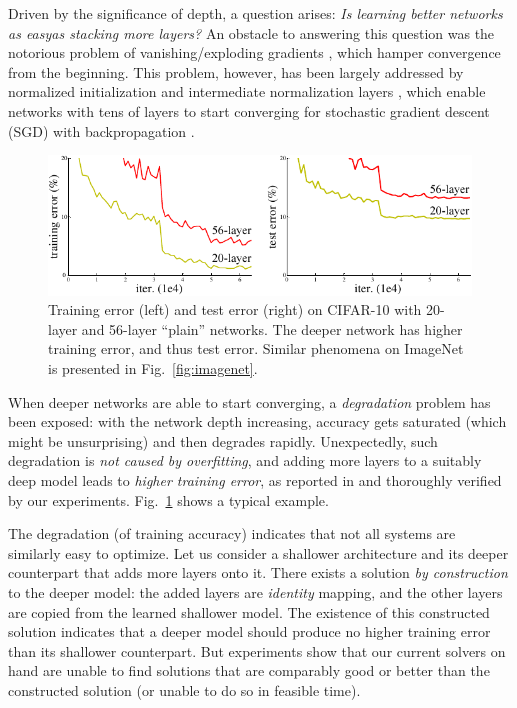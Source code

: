 \documentclass[10pt,twocolumn,letterpaper]{article}
\begin{document}
Driven by the significance of depth, a question arises: \emph{Is learning better networks as easyas stacking more layers?}
An obstacle to answering this question was the notorious problem of vanishing/exploding gradients \cite{Bengio1994,Glorot2010}, which hamper convergence from the beginning. This problem, however, has been largely addressed by normalized initialization \cite{LeCun1998,Glorot2010,Saxe2013,He2015} and intermediate normalization layers \cite{Ioffe2015}, which enable networks with tens of layers to start converging for stochastic gradient descent (SGD) with backpropagation \cite{LeCun1989}.

\begin{figure}[t]
  \begin{center}
    \includegraphics[width=1.0\linewidth]{eps/teaser}
  \end{center}
  \vspace{-1.2em}
  \caption{Training error (left) and test error (right) on CIFAR-10 with 20-layer and 56-layer ``plain'' networks. The deeper network has higher training error, and thus test error. Similar phenomena on ImageNet is presented in Fig.~\ref{fig:imagenet}.}
  \label{fig:teaser}
  \vspace{-1em}
\end{figure}

When deeper networks are able to start converging, a \emph{degradation} problem has been exposed:  with the network depth increasing, accuracy gets saturated (which might be unsurprising) and then degrades rapidly. Unexpectedly, such degradation is \emph{not caused by overfitting}, and adding more layers to a suitably deep model leads to \emph{higher training error}, as reported in \cite{He2015a, Srivastava2015} and thoroughly verified by our experiments. Fig.~\ref{fig:teaser} shows a typical example.

The degradation (of training accuracy) indicates that not all systems are similarly easy to optimize. Let us consider a shallower architecture and its deeper counterpart that adds more layers onto it. There exists a solution \emph{by construction} to the deeper model: the added layers are \emph{identity} mapping, and the other layers are copied from the learned shallower model. The existence of this constructed solution indicates that a deeper model should produce no higher training error than its shallower counterpart. But experiments show that our current solvers on hand are unable to find solutions that are comparably good or better than the constructed solution (or unable to do so in feasible time).
\end{document}
